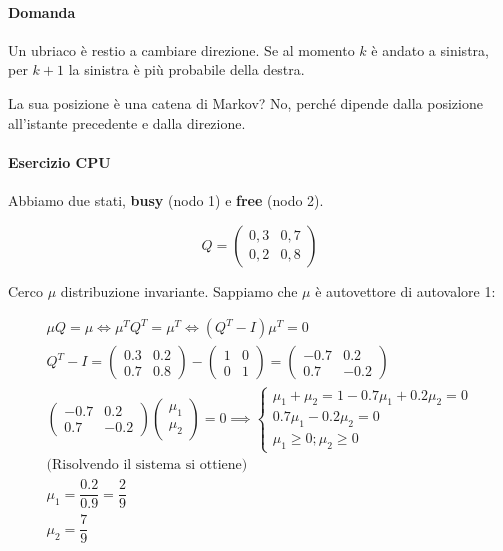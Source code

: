 
\paragraph{Domanda}
Un ubriaco è restio a cambiare direzione.
Se al momento $ k $ è andato a sinistra, per $ k+1 $ la sinistra è più probabile della destra.

La sua posizione è una catena di Markov? No, perché dipende dalla posizione all'istante precedente e dalla direzione.

\paragraph{Esercizio CPU}

Abbiamo due stati, \textbf{busy} (nodo 1) e \textbf{free} (nodo 2).

\[ Q = \begin{pmatrix}
0,3 & 0,7 \\
0,2 & 0,8
\end{pmatrix} \]

Cerco $ \mu $ distribuzione invariante. Sappiamo che $ \mu $ è autovettore di autovalore 1:

\[ \begin{aligned}
\mu Q = \mu \iff \mu^T Q^T = \mu^T \iff (Q^T -I)\mu^T = 0 \\
Q^T - I = \begin{pmatrix}
0.3 & 0.2 \\
0.7 & 0.8
\end{pmatrix} - \begin{pmatrix}
1 & 0 \\ 0 & 1
\end{pmatrix} = \begin{pmatrix}
-0.7 & 0.2 \\
0.7 & -0.2
\end{pmatrix} \\
 \begin{pmatrix}
-0.7 & 0.2 \\
0.7 & -0.2
\end{pmatrix} \begin{pmatrix}
\mu_1 \\ \mu_2
\end{pmatrix} = 0 
\implies \begin{cases}
\mu_1 + \mu_2 = 1
-0.7\mu_1 + 0.2 \mu_2 = 0 \\
0.7\mu_1 - 0.2 \mu_2 = 0 \\
\mu_1 \geq 0; \mu_2 \geq 0
\end{cases} \\
\text{(Risolvendo il sistema si ottiene)} \\
\mu_1 = \dfrac{0.2}{0.9} = \dfrac{2}{9} \\
\mu_2 = \dfrac{7}{9}
\end{aligned} \]

